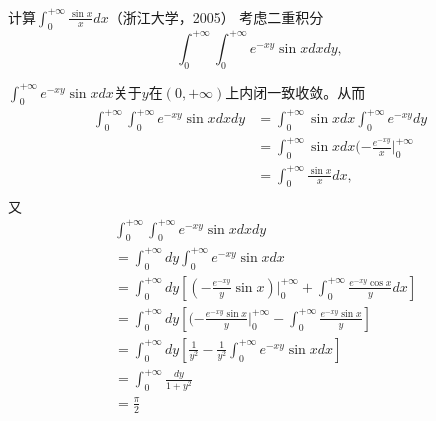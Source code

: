     \begin{example}
    \hfill\\
    计算$\int_0^{+\infty}\frac{\sin x}xdx$（浙江大学，2005）
  考虑二重积分$$\int_0^{+\infty}\int_0^{+\infty}e^{-xy}\sin xdxdy,$$
    
    
    $\int_0^{+\infty}e^{-xy}\sin xdx$关于$y$在$(0,+\infty)$上内闭一致收敛。从而
  \begin{equation}
  \begin{aligned}
  \int_0^{+\infty}\int_0^{+\infty}e^{-xy}\sin xdxdy&=\int_0^{+\infty}\sin xdx\int_0^{+\infty}e^{-xy}dy\\
  &=\int_0^{+\infty}\sin xdx(-\frac{e^{-xy}}{x}|_0^{+\infty}\\
  &=\int_0^{+\infty}\frac{\sin x}xdx,\\
  \end{aligned}
  \end{equation}
  又
  \begin{equation}
  \begin{aligned}
  &\int_0^{+\infty}\int_0^{+\infty}e^{-xy}\sin xdxdy\\
  &=\int_0^{+\infty}dy\int_0^{+\infty}e^{-xy}\sin xdx\\
  &=\int_0^{+\infty}dy[(-\frac{e^{-xy}}{y}\sin x)|_0^{+\infty}+\int_0^{+\infty}\frac{e^{-xy}\cos x}{y}dx]\\
  &=\int_0^{+\infty}dy[(-\frac{e^{-xy}\sin x}{y}|_0^{+\infty}-\int_0^{+\infty}\frac{e^{-xy}\sin x}{y}]\\
  &=\int_0^{+\infty}dy[\frac{1}{y^2}-\frac{1}{y^2}\int_0^{+\infty}e^{-xy}\sin xdx]\\
  &=\int_0^{+\infty}\frac{dy}{1+y^2}\\
  &=\frac{\pi}{2}
  \end{aligned}
  \end{equation}
    
    \end{example}  
